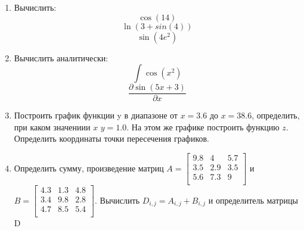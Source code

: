 \begin{enumerate}
\item Вычислить: 
\begin{equation*}\cos(14)                          \end{equation*}
\begin{equation*}\ln(3+sin(4))                     \end{equation*}
\begin{equation*}\sin(4 e^2)                       \end{equation*}

\item Вычислить аналитически: 
 \begin{equation*} \int \cos(x^2)          \end{equation*}\begin{equation*} {\dfrac{\partial \sin(5 x +3)}{\partial x}} \end{equation*}
\item Построить график функции y в диапазоне от $x=3.6$ до $x=38.6$, определить, при каком значениии $x$ $y=1.0$. На этом же графике построить функцию $z $. Определить координаты точки пересечения графиков. \item Определить сумму, произведение матриц $A=\begin{bmatrix}
9.8 &4 &5.7 \\
3.5 &2.9 &3.5 \\
5.6 &7.3 &9 \\
\end{bmatrix}
$ и $B=\begin{bmatrix}
4.3 &1.3 &4.8 \\
3.4 &9.8 &2.8 \\
4.7 &8.5 &5.4 \\
\end{bmatrix}
$. Вычислить $D_{i,j}=A_{i,j} + B_{i,j}$ и определитель матрицы D
\end{enumerate}
